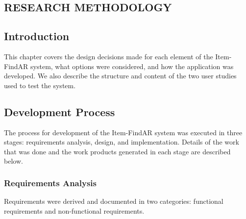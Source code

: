 \documentclass[thesis]{fputhesis}
\begin{document}
\begin{body}
\chapter{RESEARCH METHODOLOGY}
\section{Introduction}
This chapter covers the design decisions made for each element of the Item-FindAR system, what options were considered, and how the application was developed. We also describe the structure and content of the two user studies used to test the system.

\section{Development Process}
The process for development of the Item-FindAR system was executed in three stages: requirements analysis, design, and implementation. Details of the work that was done and the work products generated in each stage are described below.
\subsection{Requirements Analysis}
Requirements were derived and documented in two categories: functional requirements and non-functional requirements.

\end{body}
\end{document}
